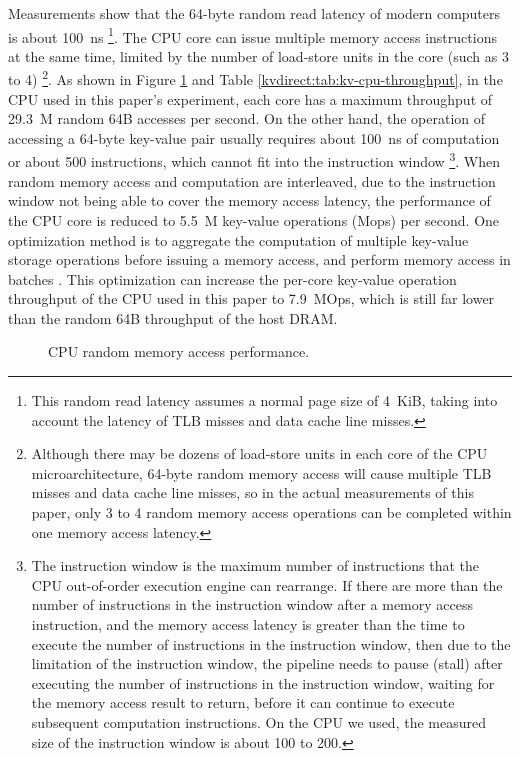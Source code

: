 Measurements show that the 64-byte random read latency of modern computers is about 100~ns \footnote{This random read latency assumes a normal page size of 4~KiB, taking into account the latency of TLB misses and data cache line misses.}. The CPU core can issue multiple memory access instructions at the same time, limited by the number of load-store units in the core (such as 3 to 4) \cite {gharachorloo1992hiding,han2010packetshader,zhang2015mega} \footnote{Although there may be dozens of load-store units in each core of the CPU microarchitecture, 64-byte random memory access will cause multiple TLB misses and data cache line misses, so in the actual measurements of this paper, only 3 to 4 random memory access operations can be completed within one memory access latency.}. As shown in Figure \ref{kvdirect:fig:cpu-mem} and Table \ref{kvdirect:tab:kv-cpu-throughput}, in the CPU used in this paper's experiment, each core has a maximum throughput of 29.3~M random 64B accesses per second. On the other hand, the operation of accessing a 64-byte key-value pair usually requires about 100~ns of computation or about 500 instructions, which cannot fit into the instruction window \footnote{The instruction window is the maximum number of instructions that the CPU out-of-order execution engine can rearrange. If there are more than the number of instructions in the instruction window after a memory access instruction, and the memory access latency is greater than the time to execute the number of instructions in the instruction window, then due to the limitation of the instruction window, the pipeline needs to pause (stall) after executing the number of instructions in the instruction window, waiting for the memory access result to return, before it can continue to execute subsequent computation instructions. On the CPU we used, the measured size of the instruction window is about 100 to 200.}. When random memory access and computation are interleaved, due to the instruction window not being able to cover the memory access latency, the performance of the CPU core is reduced to 5.5~M key-value operations (Mops) per second. One optimization method is to aggregate the computation of multiple key-value storage operations before issuing a memory access, and perform memory access in batches \cite {li2016full,narula2014phase}. This optimization can increase the per-core key-value operation throughput of the CPU used in this paper to 7.9~MOps, which is still far lower than the random 64B throughput of the host DRAM.

\begin{figure}[htbp]
	\centering
	\caption{CPU random memory access performance.}
	\label{kvdirect:fig:cpu-mem}
\end{figure}


